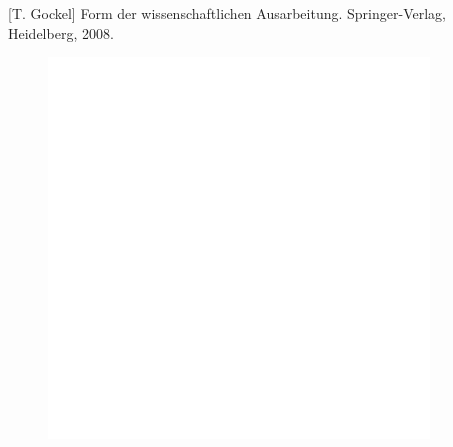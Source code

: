 \documentclass[a4paper,english,twoside,openright,11pt]{report}
\theoremstyle{plain}
\begin{document}





\nocite{*} %
\cleardoublepage
{}

%


[T. \mbox{Gockel}] Form der wissenschaftlichen Ausarbeitung. Springer-Verlag, Heidelberg, 2008. \label{quelle}





\renewcommand\indexname{Subject index}
\cleardoublepage
{}
\linespread{0.99} %
\printindex




\newpage                                    
\pagestyle{empty}
\begin{figure}[H]
\centering
\includegraphics[width=0.9\textwidth]{BilderAllgemein/leer.jpg}
\end{figure}
\end{document}
